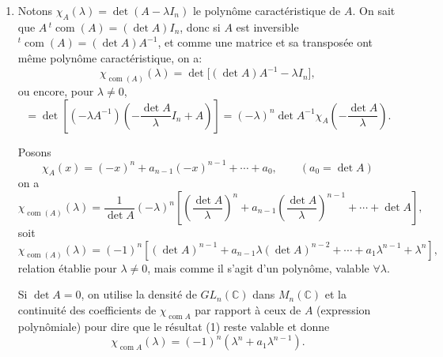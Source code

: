 \begin{enumerate}[label=\arabic*.,leftmargin=2.2em,itemsep=1.1em]
L'équation $\dfrac{\lambda^2}{2+\lambda}=\mu_j$ ou encore $\lambda^2-\mu_j\lambda-2\mu_j$ a pour discriminant $\mu_j(8+\mu_j)$. Donc si $\mu_j\notin\{0,-8\}$, elle donne 2 valeurs distinctes $\lambda_j,\lambda'_j$, valeurs propres de $B$, et des sous-espaces propres de dimension chacun $\alpha_j$.

On a donc, si $\{0,-8\}\cap\operatorname{spectre}(A)=\varnothing$, $B$ admet $2r$ valeurs propres distinctes, et des sous-espaces propres dont la somme des dimensions sera $2\sum_{j=1}^r\alpha_j$. C'est $2n\Longleftrightarrow\sum_{j=1}^r\alpha_j=n$ soit $\Longleftrightarrow A$ diagonalisable.

Si 0 ou $-8$ est valeur propre de $A$, par exemple $\mu_1=0$, la somme des dimensions des sous-espaces propres de $B$ sera $2(\alpha_1+\cdots+\alpha_r)-\alpha_1$ au plus, donc strictement inférieure à $2n$.

D'où
\[
(B\text{ diagonalisable})\Longleftrightarrow
(A\text{ diagonalisable et }0\text{ et }-8\text{ non valeurs propres de }A).
\]

\item Notons $\chi_A(\lambda)=\det(A-\lambda I_n)$ le polynôme caractéristique de $A$.
On sait que $A\,{}^t\!\operatorname{com}(A)=(\det A)I_n$, donc si $A$ est inversible ${}^t\!\operatorname{com}(A)=(\det A)A^{-1}$, et comme une matrice et sa transposée ont même polynôme caractéristique, on a:
\[
\chi_{\operatorname{com}(A)}(\lambda)=\det\bigl[(\det A)A^{-1}-\lambda I_n\bigr],
\]
ou encore, pour $\lambda\ne0$,
\[
=\det\left[(-\lambda A^{-1})\left(-\frac{\det A}{\lambda}I_n+A\right)\right]
=(-\lambda)^n\det A^{-1}\chi_A\left(-\frac{\det A}{\lambda}\right).
\]

Posons
\[
\chi_A(x)=(-x)^n+a_{n-1}(-x)^{n-1}+\cdots+a_0,
\qquad(a_0=\det A)
\]
on a
\[
\chi_{\operatorname{com}(A)}(\lambda)
=\frac1{\det A}(-\lambda)^n\left[\left(\frac{\det A}{\lambda}\right)^n+a_{n-1}\left(\frac{\det A}{\lambda}\right)^{n-1}+\cdots+\det A\right],
\]
soit
\[
\tag{1}
\chi_{\operatorname{com}(A)}(\lambda)
=(-1)^n\left[(\det A)^{n-1}+a_{n-1}\lambda(\det A)^{n-2}+\cdots+a_1\lambda^{n-1}+\lambda^n\right],
\]
relation établie pour $\lambda\ne0$, mais comme il s'agit d'un polynôme, valable $\forall\lambda$.

Si $\det A=0$, on utilise la densité de $GL_n(\mathbb C)$ dans $M_n(\mathbb C)$ et la continuité des coefficients de $\chi_{\operatorname{com}A}$ par rapport à ceux de $A$ (expression polynômiale) pour dire que le résultat (1) reste valable et donne
\[
\chi_{\operatorname{com}A}(\lambda)=(-1)^n(\lambda^n+a_1\lambda^{n-1}).
\]


\end{enumerate}
